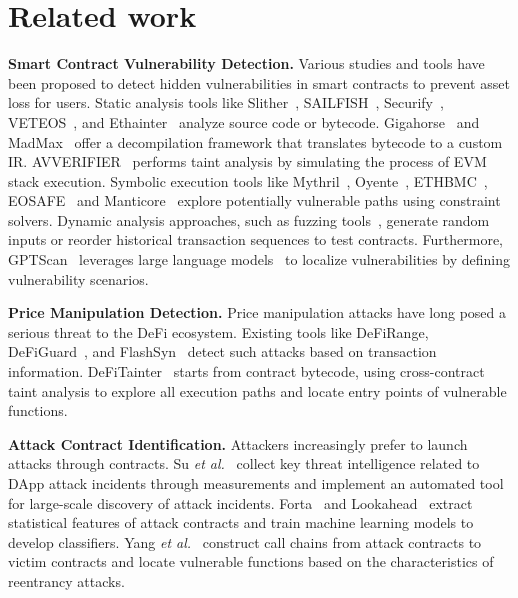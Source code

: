 \section{Related work}
\label{sec:related}


\noindent \textbf{Smart Contract Vulnerability Detection.} Various studies and tools have been proposed to detect hidden vulnerabilities in smart contracts to prevent asset loss for users. Static analysis tools like Slither~\cite{feist2019slither}, SAILFISH~\cite{bose2022sailfish},  Securify~\cite{tsankov2018securify}, VETEOS~\cite{liveteos}, and Ethainter~\cite{brent2020ethainter} analyze source code or bytecode. Gigahorse~\cite{grech2019gigahorse, grech2022elipmoc}  and MadMax~\cite{grech2018madmax} offer a decompilation framework that translates bytecode to a custom IR. AVVERIFIER~\cite{sun2024all} performs taint analysis by simulating the process of EVM stack execution. Symbolic execution tools like Mythril~\cite{mythril}, Oyente~\cite{luu2016making}, ETHBMC~\cite{frank2020ethbmc}, EOSAFE~\cite{he2021eosafe} and Manticore~\cite{mossberg2019manticore} explore potentially vulnerable paths using constraint solvers. Dynamic analysis approaches, such as fuzzing tools~\cite{jiang2018contractfuzzer, grieco2020echidna, manes2018fuzzing, choi2021smartian, shou2023ityfuzz, wustholz2020harvey, he2019learning, ye2023detecting}, generate random inputs or reorder historical transaction sequences to test contracts. Furthermore, GPTScan~\cite{sun2024gptscan} leverages large language models~\cite{he2024large} to localize vulnerabilities by defining vulnerability scenarios.


\noindent \textbf{Price Manipulation Detection.} Price manipulation attacks have long posed a serious threat to the DeFi ecosystem. Existing tools like DeFiRange\cite{wu2023defiranger}, DeFiGuard~\cite{wang2024defiguard}, and FlashSyn~\cite{chen2024flashsyn} detect such attacks based on transaction information. DeFiTainter~\cite{kong2023defitainter} starts from contract bytecode, using cross-contract taint analysis to explore all execution paths and locate entry points of vulnerable functions.


\noindent \textbf{Attack Contract Identification.} Attackers increasingly prefer to launch attacks through contracts. Su \textit{et al.}~\cite{su2021evil} collect key threat intelligence related to DApp attack incidents through measurements and implement an automated tool for large-scale discovery of attack incidents. Forta~\cite{forta} and Lookahead~\cite{ren2024lookahead} extract statistical features of attack contracts and train machine learning models to develop classifiers. Yang \textit{et al.}~\cite{yang2024uncover} construct call chains from attack contracts to victim contracts and locate vulnerable functions based on the characteristics of reentrancy attacks.